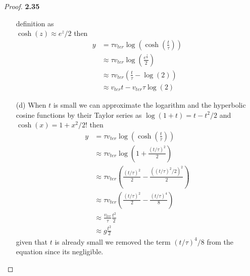 \documentclass[11pt]{article}
\theoremstyle{definition}
\begin{document}
\begin{proof}{\textbf{2.35}}
\begin{itemize}
            definition as \\ $\cosh(z) \approx e^z/2$ then
            \begin{align*}
                y &= \tau v_{ter} \log(\cosh(\frac{t}{\tau}))\\
                  &\approx \tau v_{ter} \log(\frac{e^\frac{t}{\tau}}{2})\\
                  &\approx \tau v_{ter} \left(\frac{t}{\tau} - \log(2)\right)\\
                  &\approx v_{ter}t - v_{ter}\tau \log(2)
            \end{align*}
            \item[(d)] When $t$ is small we can approximate the logarithm and
            the hyperbolic cosine functions by their Taylor series as
            $\log(1 + t) = t - t^2/2$ and $\cosh(x) = 1 + x^2/2!$ then
            \begin{align*}
                y &= \tau v_{ter} \log(\cosh(\frac{t}{\tau}))\\
                  &\approx \tau v_{ter} \log(1 + \frac{(t/\tau)^2}{2})\\
                  &\approx \tau v_{ter} \left(\frac{(t/\tau)^2}{2} - \frac{((t/\tau)^2/2)^2}{2}\right)\\
                  &\approx \tau v_{ter} \left(\frac{(t/\tau)^2}{2} - \frac{(t/\tau)^4}{8}\right)\\
                  &\approx \frac{v_{ter}}{\tau} \frac{t^2}{2}\\
                  &\approx g \frac{t^2}{2}
            \end{align*}
            given that $t$ is already small we removed the term $(t/\tau)^4/8$
            from the equation since its negligible.
        \end{itemize}
    \end{proof}
\cleardoublepage
\end{document}
